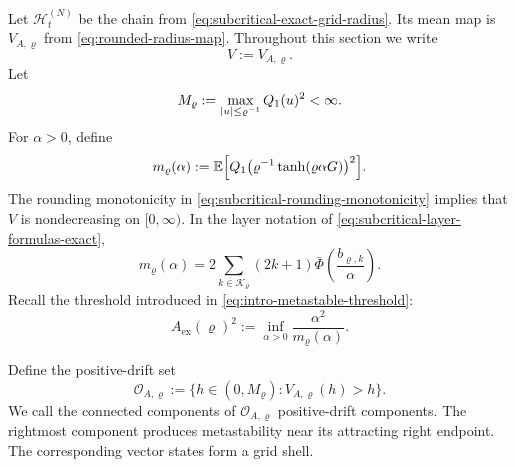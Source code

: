 \documentclass[11pt,reqno,a4paper]{article}
\newcommand{\Ee}{\E}
\begin{document}
Let $\mathscr H_t^{(N)}$ be the chain from
\cref{eq:subcritical-exact-grid-radius}. Its mean map is
$V_{A,\varrho}$ from \cref{eq:rounded-radius-map}. Throughout this section we
write
\begin{equation*}
  V:=V_{A,\varrho}.
\end{equation*}
Let
\begin{equation}\label{eq:metastable-radius-bound}
  M_\varrho
  :=
  \max_{\abs u\leq\varrho^{-1}} Q_1(u)^2
  <\infty .
\end{equation}
For $\alpha>0$, define
\begin{equation}\label{eq:metastable-rounded-profile}
  m_\varrho(\alpha)
  :=
  \Ee\left[
    Q_1\left(
      \varrho^{-1}\tanh(\varrho\alpha G)
    \right)^2
  \right].
\end{equation}
The rounding monotonicity in \cref{eq:subcritical-rounding-monotonicity}
implies that $V$ is nondecreasing on $[0,\infty)$. In the layer notation of
\cref{eq:subcritical-layer-formulas-exact},
\begin{equation}\label{eq:metastable-rounded-profile-layer}
  m_\varrho(\alpha)
  =
  2\sum_{k\in\mathcal K_\varrho}
  (2k+1)
  \bar\Phi\left(\frac{b_{\varrho,k}}{\alpha}\right).
\end{equation}
Recall the threshold introduced in \cref{eq:intro-metastable-threshold}:
\begin{equation}\label{eq:metastable-exact-threshold}
  A_{\mathrm{ex}}(\varrho)^2
  :=
  \inf_{\alpha>0}
  \frac{\alpha^2}{m_\varrho(\alpha)} .
\end{equation}

Define the positive-drift set
\begin{equation}\label{eq:metastable-positive-region}
  \mathcal O_{A,\varrho}
  :=
  \{h\in(0,M_\varrho):V_{A,\varrho}(h)>h\}.
\end{equation}
We call the connected components of $\mathcal O_{A,\varrho}$ positive-drift
components. The rightmost component produces metastability near its attracting
right endpoint. The corresponding vector states form a grid shell.
\end{document}
